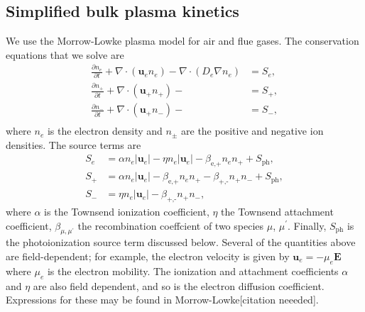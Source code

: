 \documentclass[3p]{elsarticle}
\def\bmu{\ensuremath{\bm{u}}}
\begin{document}
\subsection{Simplified bulk plasma kinetics}
We use the Morrow-Lowke plasma model for air and flue gases. The conservation equations that we solve are
\begin{subequations}
  \begin{align}
    \frac{\partial n_e}{\partial t} + \nabla\cdot(\bmu_en_e) - \nabla\cdot(D_e\nabla n_e) &= S_e, \\
    \frac{\partial n_+}{\partial t} + \nabla\cdot(\bmu_+n_+) -  &= S_+, \\
    \frac{\partial n_-}{\partial t} + \nabla\cdot(\bmu_+n_-) -  &= S_-, \\
  \end{align}
\end{subequations}
where $n_e$ is the electron density and $n_\pm$ are the positive and negative ion densities. The source terms are
\begin{subequations}
  \begin{align}
    S_e &= \alpha n_e\left|\bmu_e\right| - \eta n_e\left|\bmu_e\right| - \beta_{\text{e,+}}n_en_+ + S_{\text{ph}},\\
    S_+ &= \alpha n_e\left|\bmu_e\right| - \beta_{\text{e,+}}n_en_+ - \beta_{\text{+,-}}n_+n_- + S_{\text{ph}}, \\
    S_- &= \eta n_e\left|\bmu_e\right| - \beta_{\text{+,-}}n_+n_-,
  \end{align}
\end{subequations}
where $\alpha$ is the Townsend ionization coefficient, $\eta$ the Townsend attachment coefficient, $\beta_{\mu,\mu^\prime}$ the recombination coeffcient of two species $\mu$, $\mu^\prime$. Finally, $S_{\text{ph}}$ is the photoionization source term discussed below. Several of the quantities above are field-dependent; for example, the electron velocity is given by $\bmu_e = -\mu_e\bm{E}$ where $\mu_e$ is the electron mobility. The ionization and attachment coefficients $\alpha$ and $\eta$ are also field dependent, and so is the electron diffusion coefficient. Expressions for these may be found in Morrow-Lowke[citation neeeded]. 
\end{document}
